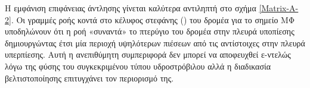 Η εμφάνιση επιφάνειας άντλησης γίνεται καλύτερα αντιληπτή στο σχήμα \ref{Matrix-A-2}. Οι γραμμές ροής κοντά στο κέλυφος στεφάνης () του δρομέα για το σημείο ΜΦ υποδηλώνουν ότι η ροή «συναντά» το πτερύγιο του δρομέα στην πλευρά υποπίεσης δημιουργώντας έτσι μία περιοχή υψηλότερων πιέσεων από τις αντίστοιχες στην πλευρά υπερπίεσης. Αυτή η ανεπιθύμητη συμπεριφορά δεν μπορεί να αποφευχθεί ε-ντελώς λόγω της φύσης του συγκεκριμένου τύπου υδροστρόβιλου αλλά η διαδικασία βελτιστοποίησης επιτυγχάνει τον περιορισμό της.       

\begin{figure}[h!]
\begin{minipage}[b]{0.5\linewidth}
 \centering
\end{minipage}
\begin{minipage}[b]{0.5\linewidth}
 \centering

\end{minipage}
\end{figure}
